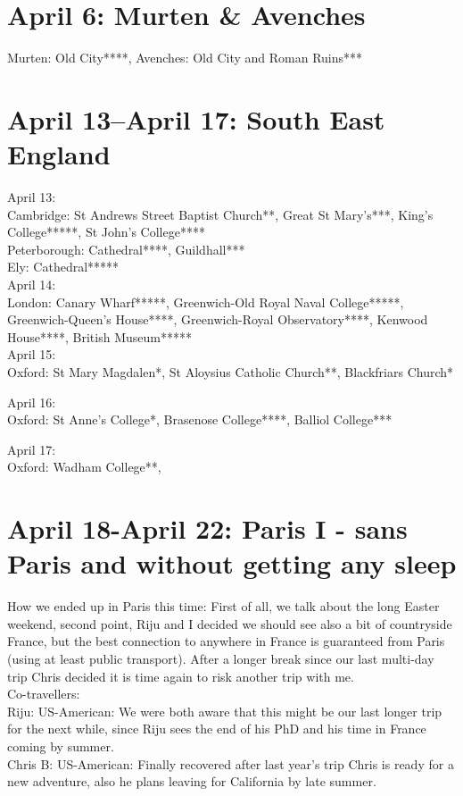 \section{April 6: Murten \& Avenches}
\label{Birthday2019}

Murten: Old City****, Avenches: Old City and Roman Ruins***

\section{April 13--April 17: South East England}
\label{2019SouthEastEngland}

April 13:\\
Cambridge: St Andrews Street Baptist Church**, Great St Mary's***, King's College*****, St John's College****\\
Peterborough: Cathedral****, Guildhall***\\
Ely: Cathedral*****\\

April 14:\\
London: Canary Wharf*****, Greenwich-Old Royal Naval College*****, Greenwich-Queen's House****, Greenwich-Royal Observatory****, Kenwood House****, British Museum*****\\

April 15: \\
Oxford: St Mary Magdalen*, St Aloysius Catholic Church**, Blackfriars Church*

April 16:\\
Oxford: St Anne's College*, Brasenose College****, Balliol College***

April 17:\\
Oxford: Wadham College**, 

\section{April 18-April 22: Paris I - sans Paris and without getting any sleep}
\label{2019:Paris I}

How we ended up in Paris this time: First of all, we talk about the long Easter weekend, second point, Riju and I decided we should see also a bit of countryside France, but the best connection to anywhere in France is guaranteed from Paris (using at least public transport). After a longer break since our last multi-day trip Chris decided it is time again to risk another trip with me.\\

Co-travellers:\\
Riju: US-American: We were both aware that this might be our last longer trip for the next while, since Riju sees the end of his PhD and his time in France coming by summer.\\
Chris B: US-American: Finally recovered after last year's trip Chris is ready for a new adventure, also he plans leaving for California by late summer.\\

